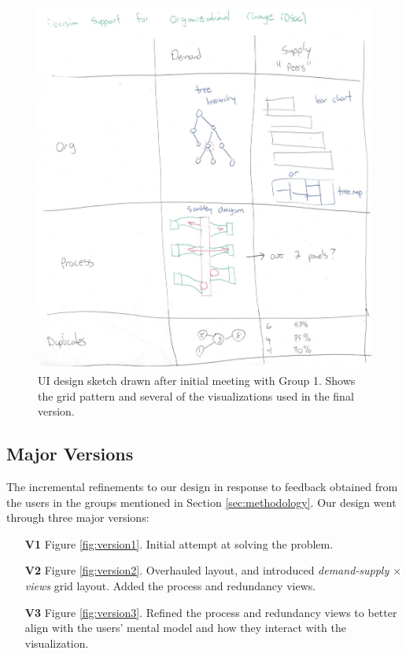 \documentclass[journal]{vgtc}                %
\begin{document}
\begin{figure}
	\centering
	\includegraphics[width=\columnwidth]{pictures/Sketch.jpg}
	\caption{UI design sketch drawn after initial meeting with Group 1. Shows the grid pattern and several of the visualizations used in the final version.}
	\label{fig:sketch}
\end{figure}

\subsection{Major Versions}

The incremental refinements to our design in response to feedback obtained from the users in the groups mentioned in Section \ref{sec:methodology}. Our design went through three major versions:

\begin{enumerate}
	\item [\textbf{V1}] Figure \ref{fig:version1}. Initial attempt at solving the problem. 
	\item [\textbf{V2}] Figure \ref{fig:version2}. Overhauled layout, and introduced \emph{demand-supply $\times$ views} grid layout. Added the process and redundancy views.
	\item [\textbf{V3}] Figure \ref{fig:version3}. Refined the process and redundancy views to better align with the users' mental model and how they interact with the visualization.
\end{enumerate}
\end{document}
